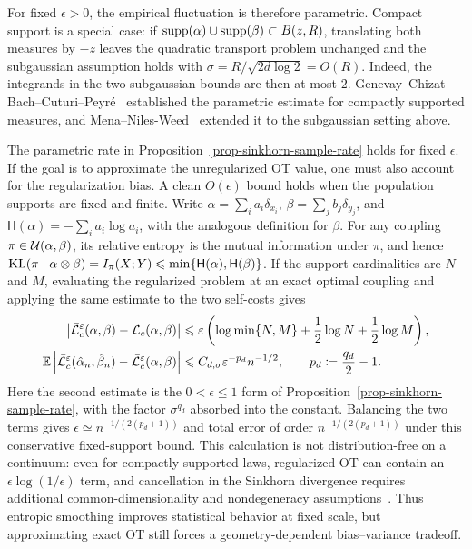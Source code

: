 For fixed \(\epsilon>0\), the empirical fluctuation is therefore parametric. Compact support is a special case: if \(\operatorname{supp}(\alpha)\cup\operatorname{supp}(\beta)\subset B(z,R)\), translating both measures by \(-z\) leaves the quadratic transport problem unchanged and the subgaussian assumption holds with \(\sigma=R/\sqrt{2d\log 2}=O(R)\).
Indeed, the integrands in the two subgaussian bounds are then at most \(2\). Genevay--Chizat--Bach--Cuturi--Peyr\'e~\cite{genevay2018sample} established the parametric estimate for compactly supported measures, and Mena--Niles-Weed~\cite{mena2019statistical} extended it to the subgaussian setting above.

\begin{rem}\label{rem-sinkhorn-no-free-lunch}
		The parametric rate in Proposition~\ref{prop-sinkhorn-sample-rate} holds for fixed $\epsilon$. If the goal is to approximate the unregularized OT value, one must also account for the regularization bias. A clean $O(\epsilon)$ bound holds when the population supports are fixed and finite. Write $\alpha=\sum_i a_i\delta_{x_i}$, $\beta=\sum_j b_j\delta_{y_j}$, and $\mathsf H(\alpha)=-\sum_i a_i\log a_i$, with the analogous definition for $\beta$. For any coupling $\pi\in\mathcal{U}(\alpha,\beta)$, its relative entropy is the mutual information under $\pi$, and hence
		$\mathrm{KL}(\pi\mid\alpha\otimes\beta)=I_\pi(X;Y)\leqslant\min\{\mathsf H(\alpha),\mathsf H(\beta)\}$.
		If the support cardinalities are $N$ and $M$, evaluating the regularized problem at an exact optimal coupling and applying the same estimate to the two self-costs gives
		\[
			\begin{aligned}
				\left\lvert\bar{\mathcal{L}}_c^\varepsilon(\alpha,\beta)-\mathcal{L}_c(\alpha,\beta)\right\rvert
				&\leqslant
				\varepsilon\left(\log\min\{N,M\}+\frac12\log N+\frac12\log M\right),\\
				\mathbb{E}\left\lvert\bar{\mathcal{L}}_c^\varepsilon(\hat\alpha_n,\hat\beta_n)-\bar{\mathcal{L}}_c^\varepsilon(\alpha,\beta)\right\rvert
				&\leqslant C_{d,\sigma}\varepsilon^{-p_d}n^{-1/2},
				\qquad p_d\coloneqq\frac{q_d}{2}-1.
			\end{aligned}
		\]
		Here the second estimate is the $0<\epsilon\leq1$ form of Proposition~\ref{prop-sinkhorn-sample-rate}, with the factor $\sigma^{q_d}$ absorbed into the constant. Balancing the two terms gives \(\epsilon\simeq n^{-1/(2(p_d+1))}\) and total error of order \(n^{-1/(2(p_d+1))}\) under this conservative fixed-support bound. This calculation is not distribution-free on a continuum: even for compactly supported laws, regularized OT can contain an $\epsilon\log(1/\epsilon)$ term, and cancellation in the Sinkhorn divergence requires additional common-dimensionality and nondegeneracy assumptions~\cite{genevay2018sample,CarlierPegonTamanini2023EntropicRates}. Thus entropic smoothing improves statistical behavior at fixed scale, but approximating exact OT still forces a geometry-dependent bias--variance tradeoff.
\end{rem}

